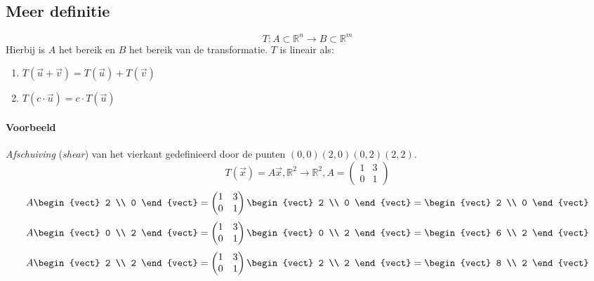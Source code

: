 \subsection{Meer definitie}
\[T: A \subset \mathbb{R}^n \to B \subset \mathbb{R}^m \]
Hierbij is $A$ het bereik en $B$ het bereik van de transformatie. $T$ is lineair als:
\begin{enumerate}
	\item $T(\vec{u} + \vec{v}) = T(\vec{u}) + T(\vec{v})$
	\item $T(c \cdot \vec{u}) = c \cdot T(\vec{u})$
\end{enumerate}

\paragraph{Voorbeeld} \emph{Afschuiving} (\emph{shear})   van het vierkant gedefinieerd door de punten $(0,0) (2,0) (0,2) (2,2)$.
\[ T(\vec{x}) = A \vec{x}, \mathbb{R}^2 \to \mathbb{R}^2, A = \left(\!\begin{array}{rr}
	1 & 3 \\
	0 & 1
\end{array}\!\right) \]
\[ A\begin{vect} 2 \\ 0 \end{vect} = \begin{pmatrix*}[r]
	1 & 3 \\
	0 & 1
\end{pmatrix*} \begin{vect} 2 \\ 0 \end{vect} = \begin{vect} 2 \\ 0 \end{vect} \]
\[ A\begin{vect} 0 \\ 2 \end{vect} = \begin{pmatrix*}[r]
	1 & 3 \\
	0 & 1
\end{pmatrix*} \begin{vect} 0 \\ 2 \end{vect} = \begin{vect} 6 \\ 2 \end{vect} \]
\[ A\begin{vect} 2 \\ 2 \end{vect} = \begin{pmatrix*}[r]
	1 & 3 \\
	0 & 1
\end{pmatrix*} \begin{vect} 2 \\ 2 \end{vect} = \begin{vect} 8 \\ 2 \end{vect} \]


